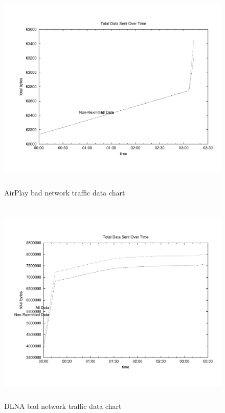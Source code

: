 \begin{figure}[htb]
\centering \includegraphics[height=10cm]{charts/AirPlay_traffic_5loss_data}
\caption{AirPlay bad network traffic data chart \label{chart6}}
\end{figure}
\begin{figure}[htb]
\centering \includegraphics[height=10cm]{charts/dlna_traffic_5loss_data}
\caption{DLNA bad network traffic data chart \label{chart6}}
\end{figure}


